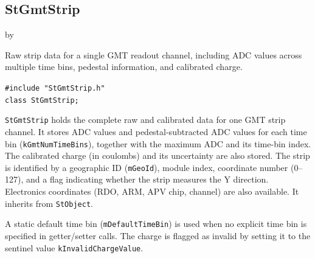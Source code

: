 \documentclass[twoside]{article}
\newcommand{\entrylabel}[1]{\mbox{\textbf{{#1}}}\hfil}%
\newenvironment{entry}
{\begin{list}{}%
    {\renewcommand{\makelabel}{\entrylabel}%
     \setlength{\labelwidth}{90pt}%
     \setlength{\leftmargin}{\labelwidth}
     \advance\leftmargin by \labelsep%
      }%
    }%
  {\end{list}}
\newcommand{\Entrylabel}[1]%
{\raisebox{0pt}[1ex][0pt]{\makebox[\labelwidth][l]%
    {\parbox[t]{\labelwidth}{\hspace{0pt}\textbf{{#1}}}}}}
\newenvironment{Entry}%
{\renewcommand{\entrylabel}{\Entrylabel}\begin{entry}}%
  {\end{entry}}
\begin{document}
\subsection{StGmtStrip}
\label{sec:StGmtStrip}
\begin{Entry}
\item[Summary] Raw strip data for a single GMT readout channel, including ADC
    values across multiple time bins, pedestal information, and calibrated charge.
\item[Synopsis]
    \verb+#include "StGmtStrip.h"+\\
    \verb+class StGmtStrip;+\\
\item[Description]
    \texttt{StGmtStrip} holds the complete raw and calibrated data for one GMT
    strip channel.  It stores ADC values and pedestal-subtracted ADC values for
    each time bin (\texttt{kGmtNumTimeBins}), together with the maximum ADC
    and its time-bin index.  The calibrated charge (in coulombs) and its
    uncertainty are also stored.  The strip is identified by a geographic ID
    (\texttt{mGeoId}), module index, coordinate number (0--127), and a flag
    indicating whether the strip measures the Y direction.  Electronics
    coordinates (RDO, ARM, APV chip, channel) are also available.
    It inherits from \texttt{StObject}.

    A static default time bin (\texttt{mDefaultTimeBin}) is used when no
    explicit time bin is specified in getter/setter calls.  The charge is
    flagged as invalid by setting it to the sentinel value
    \texttt{kInvalidChargeValue}.


\end{Entry}
\end{document}
